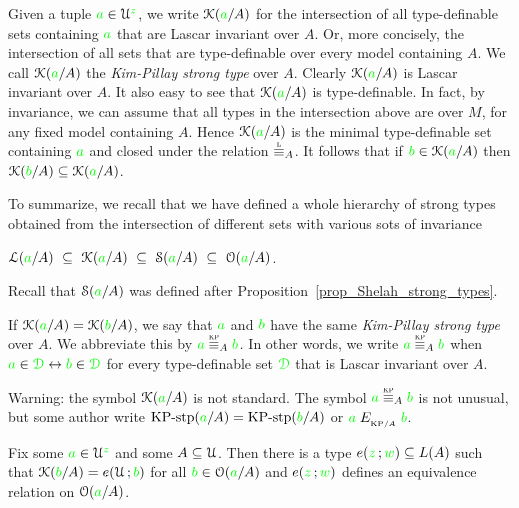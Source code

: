 Given a tuple ${\color{green} a}\in\EuScript U^{\color{green} z}$, we write \emph{$\EuScript K({\color{green} a}/A)$\/} for the intersection of all type-definable sets containing ${\color{green} a}$ that are Lascar invariant over $A$.
Or, more concisely, the intersection of all sets that are type-definable over every model containing $A$.
We call $\EuScript K({\color{green} a}/A)$ the \emph{Kim-Pillay strong type\/} over $A$.
Clearly $\EuScript K({\color{green} a}/A)$ is Lascar invariant over $A$.
It also easy to see that $\EuScript K({\color{green} a}/A)$ is type-definable.
In fact, by invariance, we can assume that all types in the intersection above are over $M$, for any fixed model containing $A$.
Hence $\EuScript K({\color{green} a}/A)$ is the minimal type-definable set containing ${\color{green} a}$ and closed under the relation $\equivL_A$.
It follows that if ${\color{green} b}\in\EuScript K({\color{green} a}/A)$ then $\EuScript K({\color{green} b}/A)\subseteq\EuScript K({\color{green} a}/A)$.

To summarize, we recall that we have defined a whole hierarchy of strong types obtained from the intersection of different sets with various sots of invariance

\hfil$\Ll({\gr a}/A)\ \subseteq\ \K({\gr a}/A)\ \subseteq\ \S({\gr a}/A)\ \subseteq\ \O({\gr a}/A)$. 

Recall that $\EuScript S({\color{green} a}/A)$ was defined after Proposition~\ref{prop_Shelah_strong_types}.

If $\EuScript K({\color{green} a}/A)=\EuScript K({\color{green} b}/A)$, we say that ${\color{green} a}$ and ${\color{green} b}$ have the same \emph{Kim-Pillay strong type\/} over $A$.
We abbreviate this by \emph{${\gr a}\stackrel{\smash{\scalebox{.5}{\rm KP}}}{\equiv}_A{\gr b}$.}
In other words, we write ${\gr a}\equivKP_A{\gr b}$ when ${\color{green} a}\in{\color{green}\EuScript D}\leftrightarrow{\color{green}b}\in{\color{green}\EuScript D}$ for every type-definable set ${\color{green}\EuScript D}$ that is Lascar invariant over $A$.


\noindent\llap{\textcolor{red}{\Large\warning}\kern1.5ex}%
Warning: the symbol $\EuScript K({\color{green} a}/A)$ is not standard.
The symbol ${\gr a}\equivKP_A{\gr b}$ is not unusual, but some author write $\mbox{KP-stp}({\color{green} a}/A)=\mbox{KP-stp}({\color{green} b}/A)$ or ${\color{green} a}\mathrel{E_{_{{\rm KP}/A}}}{\color{green} b}$.

\begin{proposition}\label{prop_bardotto}
  Fix some ${\color{green} a}\in\EuScript U^{\color{green} z}$ and some $A\subseteq\EuScript U$.
Then there is a type $e({\color{green} z}\,;{\color{green} w})\subseteq L(A)$ such that $\EuScript K({\color{green} b}/A)=e(\EuScript U\,;{\color{green} b})$ for all ${\color{green} b}\in\EuScript O({\color{green} a}/A)$ and $e({\color{green} z}\,;{\color{green} w})$ defines an equivalence relation on $\EuScript O({\color{green} a}/A)$.
\end{proposition}

